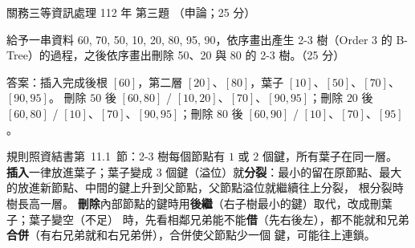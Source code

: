 \begin{pastexam}[label={px:gw3-112-ds-03}]{關務三等資訊處理 112 年 第三題}
（申論；25 分）

給予一串資料 60, 70, 50, 10, 20, 80, 95, 90，依序畫出產生 2-3 樹（Order 3 的 B-Tree）的過程，之後依序畫出刪除 50、20
與 80 的 2-3 樹。（25 分）
\end{pastexam}

\begin{pastsoln}
答案：插入完成後根 $[60]$，第二層 $[20]$、$[80]$，葉子 $[10]$、$[50]$、$[70]$、$[90, 95]$。 刪除 $50$ 後
$[60, 80]$ / $[10, 20]$、$[70]$、$[90, 95]$；刪除 $20$ 後 $[60, 80]$ / $[10]$、$[70]$、$[90, 95]$；刪除 $80$ 後
$[60, 90]$ / $[10]$、$[70]$、$[95]$。

規則照資結書第~11.1~節：2-3 樹每個節點有 $1$ 或 $2$ 個鍵，所有葉子在同一層。 \textbf{插入}一律放進葉子；葉子變成
$3$ 個鍵（溢位）就\textbf{分裂}：最小的留在原節點、最大的放進新節點、中間的鍵上升到父節點，父節點溢位就繼續往上分裂，
根分裂時樹長高一層。 \textbf{刪除}內部節點的鍵時用\textbf{後繼}（右子樹最小的鍵）取代，改成刪葉子；葉子變空（不足）
時，先看相鄰兄弟能不能\textbf{借}（先右後左），都不能就和兄弟\textbf{合併}（有右兄弟就和右兄弟併），合併使父節點少一個
鍵，可能往上連鎖。


\end{pastsoln}
